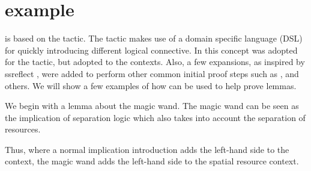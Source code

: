 \documentclass[thesis.tex]{subfiles}
\begin{document}
\section[iIntros example]{ example}
 is based on the \coq {} tactic. The \coq {} tactic makes use of a domain specific language (DSL) for quickly introducing different logical connective. In \iris this concept was adopted for the  tactic, but adopted to the \iris contexts. Also, a few expansions, as inspired by ssreflect \cite*{huetCoqProofAssistant1997, gonthierSmallScaleReflection2016}, were added to perform other common initial proof steps such as ,  and others. We will show a few examples of how  can be used to help prove lemmas.

We begin with a lemma about the magic wand. The magic wand can be seen as the implication of separation logic which also takes into account the separation of resources.

\begin{minipage}{0.4\textwidth}
  \begin{prooftree}
  \end{prooftree}
\end{minipage}
%
\begin{minipage}{0.4\textwidth}
  \begin{prooftree}
  \end{prooftree}
\end{minipage}

Thus, where a normal implication introduction adds the left-hand side to the \coq context, the magic wand adds the left-hand side to the spatial resource context.
\end{document}
